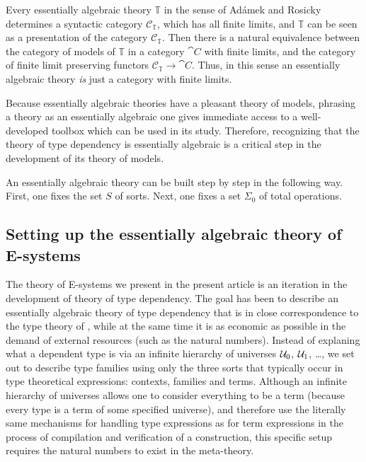 Every essentially algebraic theory $\mathbb{T}$ in the sense of Ad\'amek and Rosicky
determines a syntactic category $\mathcal{C}_\mathbb{T}$, which has all finite
limits, and $\mathbb{T}$ can be seen as a presentation of the category
$\mathcal{C}_\mathbb{T}$. Then there is a natural equivalence between the
category of models of $\mathbb{T}$ in a category $\cat{C}$ with finite limits,
and the category of finite limit preserving functors $\mathcal{C}_\mathbb{T}\to
\cat{C}$. Thus, in this sense an essentially algebraic theory \emph{is} just
a category with finite limits. 

Because essentially algebraic theories have a pleasant theory of models, 
phrasing a theory as an essentially algebraic one gives immediate access to
a well-developed toolbox which can be used in its study. Therefore, recognizing
that the theory of type dependency is essentially algebraic is a critical step
in the development of its theory of models.

An essentially algebraic theory can be built step by step in the following way.
First, one fixes the set $S$ of sorts. Next, one fixes a set $\Sigma_0$ of total
operations. 

\subsection*{Setting up the essentially algebraic theory of E-systems}
The theory of E-systems we present in the present article is an iteration in the
development of theory of type
dependency. The goal has been to describe an essentially algebraic theory of
type dependency that is in close correspondence to the type theory of
\cite{TheBook}, while at the same time it is as economic as possible in the
demand of external resources (such as the natural numbers). Instead of explaning
what a dependent type is via an infinite hierarchy of universes $\mathcal{U}_0$,
$\mathcal{U}_1$, \ldots, we set out to describe type families using only the three sorts
that typically occur in type theoretical expressions: contexts, families and 
terms. Although an infinite hierarchy of universes allows one to consider everything
to be a term (because every type is a term of some specified universe), and 
therefore use the literally same mechanisms for handling type expressions as for
term expressions in the process of compilation and verification of a 
construction, this specific setup requires the natural numbers to exist in the 
meta-theory. 

